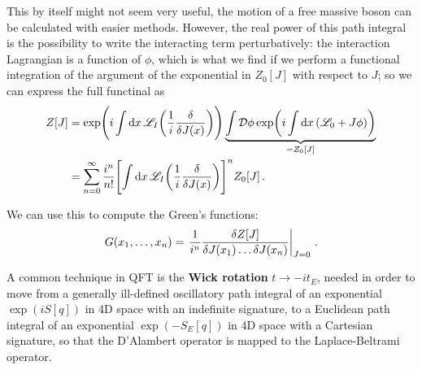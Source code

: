 \documentclass[main.tex]{subfiles}
\begin{document}

This by itself might not seem very useful, the motion of a free massive boson can be calculated with easier methods.
However, the real power of this path integral is the possibility to write the interacting term perturbatively: the interaction Lagrangian is a function of \(\phi \), which is what we find if we perform a functional integration of the argument of the exponential in \(Z_0 [J]\) with respect to \(J\); so we can express the full functinal as 
%
\begin{align}
Z[J] &= \exp( i\int \dd{x} \mathscr{L}_I\qty( \frac{1}{i} \fdv{}{J(x)}))
\underbrace{\int \mathcal{D} \phi \exp(i \int \dd{x} \qty( \mathscr{L}_0 + J \phi )) }_{= Z_0 [J]}  \\
&= \sum _{n=0}^{\infty } \frac{i^{n}}{n!} \qty[ \int \dd{x} \mathscr{L}_I\qty(\frac{1}{i} \fdv{}{J(x)})]^{n} Z_0 [J]
\,.
\end{align}

We can use this to compute the Green's functions: 
%
\begin{align}
G(x_1 , \dots , x_n) = \eval{\frac{1}{i^{n}} \frac{ \delta Z[J]}{ \delta J (x_1 ) \dots \delta J(x_n)}}_{J = 0}
\,.
\end{align}

A common technique in QFT is the \textbf{Wick rotation} \(t \to -i t_E\), needed in order to move from a generally ill-defined oscillatory path integral of an exponential \(\exp(i S[q])\) in 4D space with an indefinite signature, to a Euclidean path integral of an exponential \(\exp(- S_E[q])\) in 4D space with a Cartesian signature, so that the D'Alambert operator is mapped to the Laplace-Beltrami operator.
\end{document}

